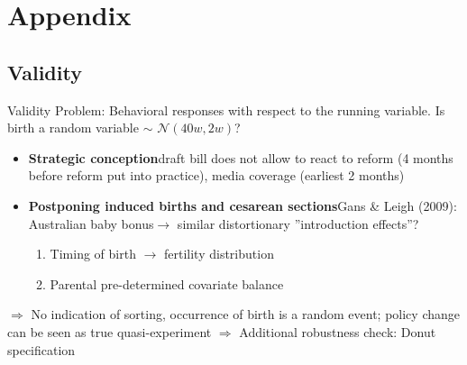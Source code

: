 \documentclass[usenames,dvipsnames]{beamer} %
\begin{document}


\section*{Appendix}
\subsection*{Validity}
\label{VALIDITY}
\begin{frame}{Validity}
Problem: Behavioral responses with respect to the running variable. Is birth a random variable $\sim$ $\mathcal{N}(40w,2w)$?\pause
\begin{itemize}
\item \textbf{Strategic conception}\newline draft bill does not allow to react to reform (4 months before reform put into practice), media coverage (earliest 2 months)

\item \textbf{Postponing induced births and cesarean sections}\newline Gans \& Leigh (2009): Australian baby bonus\newline $\rightarrow$ similar distortionary ”introduction effects”?\pause



\begin{enumerate}
\item Timing of birth $\rightarrow$ fertility distribution
\item Parental pre-determined covariate balance
\end{enumerate}
\end{itemize}\pause
\medskip
$\Rightarrow$ No indication of sorting, occurrence of birth is a random event; policy change can be seen as true quasi-experiment \newline $\Rightarrow$ Additional robustness check: Donut specification

 \hyperlink{BACK_FROM_VALIDITY}{}

\end{frame}
\end{document}
